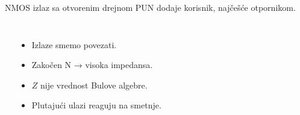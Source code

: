 \begin{frame}[label=09_3-s047]{NMOS izlaz sa otvorenim drejnom}
PUN dodaje korisnik, najčešće otpornikom.\begin{columns}[c,onlytextwidth]\centering\par\medskip{}\begin{center}

\end{center}\begin{itemize}
\item \alert{Izlaze smemo povezati.}
\item Zakočen N → visoka impedansa.
\item $Z$ nije vrednost Bulove algebre.
\item Plutajući ulazi reaguju na smetnje.
\end{itemize}\centering\end{columns}
\end{frame}
